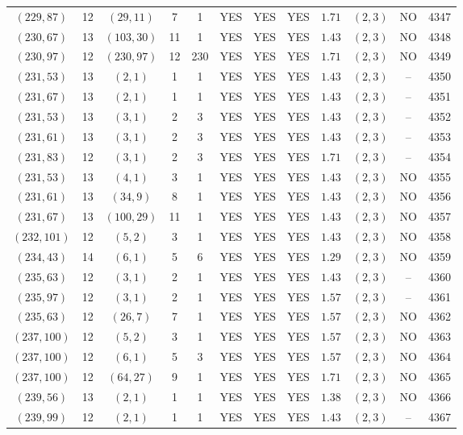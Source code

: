 \begin{longtable}{|c|c|c|c|c|c|c|c|c|c|c|c|}
$(229,87)$ & 12 & $(29,11)$ & 7 & 1 & YES & YES & YES & $1.71$ & $(2,3)$ & NO & 4347\\
$(230,67)$ & 13 & $(103,30)$ & 11 & 1 & YES & YES & YES & $1.43$ & $(2,3)$ & NO & 4348\\
$(230,97)$ & 12 & $(230,97)$ & 12 & 230 & YES & YES & YES & $1.71$ & $(2,3)$ & NO & 4349\\
$(231,53)$ & 13 & $(2,1)$ & 1 & 1 & YES & YES & YES & $1.43$ & $(2,3)$ & -- & 4350\\
$(231,67)$ & 13 & $(2,1)$ & 1 & 1 & YES & YES & YES & $1.43$ & $(2,3)$ & -- & 4351\\
$(231,53)$ & 13 & $(3,1)$ & 2 & 3 & YES & YES & YES & $1.43$ & $(2,3)$ & -- & 4352\\
$(231,61)$ & 13 & $(3,1)$ & 2 & 3 & YES & YES & YES & $1.43$ & $(2,3)$ & -- & 4353\\
$(231,83)$ & 12 & $(3,1)$ & 2 & 3 & YES & YES & YES & $1.71$ & $(2,3)$ & -- & 4354\\
$(231,53)$ & 13 & $(4,1)$ & 3 & 1 & YES & YES & YES & $1.43$ & $(2,3)$ & NO & 4355\\
$(231,61)$ & 13 & $(34,9)$ & 8 & 1 & YES & YES & YES & $1.43$ & $(2,3)$ & NO & 4356\\
$(231,67)$ & 13 & $(100,29)$ & 11 & 1 & YES & YES & YES & $1.43$ & $(2,3)$ & NO & 4357\\
$(232,101)$ & 12 & $(5,2)$ & 3 & 1 & YES & YES & YES & $1.43$ & $(2,3)$ & NO & 4358\\
$(234,43)$ & 14 & $(6,1)$ & 5 & 6 & YES & YES & YES & $1.29$ & $(2,3)$ & NO & 4359\\
$(235,63)$ & 12 & $(3,1)$ & 2 & 1 & YES & YES & YES & $1.43$ & $(2,3)$ & -- & 4360\\
$(235,97)$ & 12 & $(3,1)$ & 2 & 1 & YES & YES & YES & $1.57$ & $(2,3)$ & -- & 4361\\
$(235,63)$ & 12 & $(26,7)$ & 7 & 1 & YES & YES & YES & $1.57$ & $(2,3)$ & NO & 4362\\
$(237,100)$ & 12 & $(5,2)$ & 3 & 1 & YES & YES & YES & $1.57$ & $(2,3)$ & NO & 4363\\
$(237,100)$ & 12 & $(6,1)$ & 5 & 3 & YES & YES & YES & $1.57$ & $(2,3)$ & NO & 4364\\
$(237,100)$ & 12 & $(64,27)$ & 9 & 1 & YES & YES & YES & $1.71$ & $(2,3)$ & NO & 4365\\
$(239,56)$ & 13 & $(2,1)$ & 1 & 1 & YES & YES & YES & $1.38$ & $(2,3)$ & NO & 4366\\
$(239,99)$ & 12 & $(2,1)$ & 1 & 1 & YES & YES & YES & $1.43$ & $(2,3)$ & -- & 4367\\

\end{longtable}
